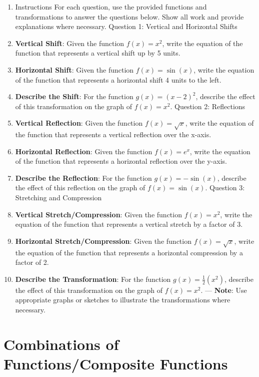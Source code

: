 \begin{enumerate}
    \item Instructions For each question, use the provided functions and transformations to answer the questions below. Show all work and provide explanations where necessary. Question 1: Vertical and Horizontal Shifts
    \item \textbf{Vertical Shift}: Given the function $f(x) = x^2$, write the equation of the function that represents a vertical shift up by 5 units.
    \item \textbf{Horizontal Shift}: Given the function $f(x) = \sin(x)$, write the equation of the function that represents a horizontal shift 4 units to the left.
    \item \textbf{Describe the Shift}: For the function $g(x) = (x - 2)^2$, describe the effect of this transformation on the graph of $f(x) = x^2$. Question 2: Reflections
    \item \textbf{Vertical Reflection}: Given the function $f(x) = \sqrt{x}$, write the equation of the function that represents a vertical reflection over the x-axis.
    \item \textbf{Horizontal Reflection}: Given the function $f(x) = e^x$, write the equation of the function that represents a horizontal reflection over the y-axis.
    \item \textbf{Describe the Reflection}: For the function $g(x) = -\sin(x)$, describe the effect of this reflection on the graph of $f(x) = \sin(x)$. Question 3: Stretching and Compression
    \item \textbf{Vertical Stretch/Compression}: Given the function $f(x) = x^2$, write the equation of the function that represents a vertical stretch by a factor of 3.
    \item \textbf{Horizontal Stretch/Compression}: Given the function $f(x) = \sqrt{x}$, write the equation of the function that represents a horizontal compression by a factor of 2.
    \item \textbf{Describe the Transformation}: For the function $g(x) = \frac{1}{2}(x^2)$, describe the effect of this transformation on the graph of $f(x) = x^2$. --- \textbf{Note}: Use appropriate graphs or sketches to illustrate the transformations where necessary.
\end{enumerate}

\section{Combinations of Functions/Composite Functions}
\label{sec:combinations-of-functions-composite-functions}

